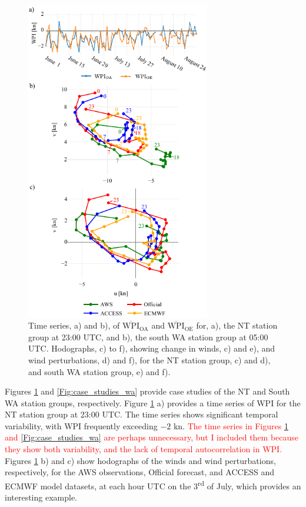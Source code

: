 \documentclass{ametsoc}
\begin{document}
\begin{figure}
\centering
\includegraphics[width=19pc]{case_studies_nt.pdf}
\caption{Time series, a) and b), of $\overline{\text{WPI}}_\text{OA}$ and $\overline{\text{WPI}}_\text{OE}$ for, a), the NT station group at 23:00 UTC, and b), the south WA station group at 05:00 UTC. Hodographs, c) to f), showing change in winds, c) and e), and wind perturbations, d) and f), for the NT station group, c) and d), and south WA station group, e) and f).}
\label{Fig:case_studies_nt}
\end{figure}

Figures \ref{Fig:case_studies_nt} and \ref{Fig:case_studies_wa} provide case studies of the NT and South WA station groups, respectively. Figure \ref{Fig:case_studies_nt} a) provides a time series of WPI for the NT station group at 23:00 UTC. The time series shows significant temporal variability, with WPI frequently exceeding $-2$ kn. \textcolor{red}{The time series in Figures \ref{Fig:case_studies_nt} and \ref{Fig:case_studies_wa} are perhaps unnecessary, but I included them because they show both variability, and the lack of temporal autocorrelation in WPI.} Figures \ref{Fig:case_studies_nt} b) and c) show hodographs of the winds and wind perturbations, respectively, for the AWS observations, Official forecast, and ACCESS and ECMWF model datasets, at each hour UTC on the 3\textsuperscript{rd} of July, which provides an interesting example. 
\end{document}
